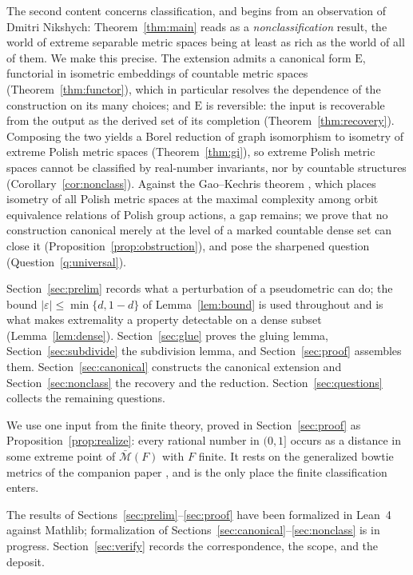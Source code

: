\documentclass[11pt]{article}
\theoremstyle{definition}
\theoremstyle{remark}
\newcommand{\bM}{\bar{\mathcal{M}}}
\newcommand{\eps}{\varepsilon}
\newcommand{\E}{\mathrm{E}}
\begin{document}
The second content concerns classification, and begins from an observation of Dmitri
Nikshych: Theorem~\ref{thm:main} reads as a \emph{nonclassification} result, the world of
extreme separable metric spaces being at least as rich as the world of all of them. We make
this precise. The extension admits a canonical form $\E$, functorial in isometric
embeddings of countable metric spaces (Theorem~\ref{thm:functor}), which in particular
resolves the dependence of the construction on its many choices; and $\E$ is reversible:
the input is recoverable from the output as the derived set of its completion
(Theorem~\ref{thm:recovery}). Composing the two yields a Borel reduction of graph
isomorphism to isometry of extreme Polish metric spaces (Theorem~\ref{thm:gi}), so extreme
Polish metric spaces cannot be classified by real-number invariants, nor by countable
structures (Corollary~\ref{cor:nonclass}). Against the Gao--Kechris theorem
\cite{GaoKechris03}, which places isometry of all Polish metric spaces at the maximal
complexity among orbit equivalence relations of Polish group actions, a gap remains; we
prove that no construction canonical merely at the level of a marked countable dense set
can close it (Proposition~\ref{prop:obstruction}), and pose the sharpened question
(Question~\ref{q:universal}).

Section~\ref{sec:prelim} records what a perturbation of a pseudometric can do; the bound
$|\eps|\le\min\{d,1-d\}$ of Lemma~\ref{lem:bound} is used throughout and is what makes
extremality a property detectable on a dense subset (Lemma~\ref{lem:dense}).
Section~\ref{sec:glue} proves the gluing lemma, Section~\ref{sec:subdivide} the subdivision
lemma, and Section~\ref{sec:proof} assembles them. Section~\ref{sec:canonical} constructs
the canonical extension and Section~\ref{sec:nonclass} the recovery and the reduction.
Section~\ref{sec:questions} collects the remaining questions.

We use one input from the finite theory, proved in Section~\ref{sec:proof} as
Proposition~\ref{prop:realize}: every rational number in $(0,1]$ occurs as a distance in
some extreme point of $\bM(F)$ with $F$ finite. It rests on the generalized bowtie metrics
of the companion paper \cite{FK-cone}, and is the only place the finite classification
enters.

The results of Sections~\ref{sec:prelim}--\ref{sec:proof} have been formalized in Lean~4
against Mathlib; formalization of Sections~\ref{sec:canonical}--\ref{sec:nonclass} is in
progress. Section~\ref{sec:verify} records the correspondence, the scope, and the deposit.
\end{document}
